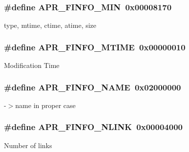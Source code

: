 \subsubsection[{\texorpdfstring{A\+P\+R\+\_\+\+F\+I\+N\+F\+O\+\_\+\+M\+IN}{APR_FINFO_MIN}}]{\setlength{\rightskip}{0pt plus 5cm}\#define A\+P\+R\+\_\+\+F\+I\+N\+F\+O\+\_\+\+M\+IN~0x00008170}\hypertarget{group__apr__file__stat_ga341104571b05550aa923cb14898a82ef}{}\label{group__apr__file__stat_ga341104571b05550aa923cb14898a82ef}
type, mtime, ctime, atime, size 
\subsubsection[{\texorpdfstring{A\+P\+R\+\_\+\+F\+I\+N\+F\+O\+\_\+\+M\+T\+I\+ME}{APR_FINFO_MTIME}}]{\setlength{\rightskip}{0pt plus 5cm}\#define A\+P\+R\+\_\+\+F\+I\+N\+F\+O\+\_\+\+M\+T\+I\+ME~0x00000010}\hypertarget{group__apr__file__stat_ga992ce1f4f75d519fd2a9d241c5a12515}{}\label{group__apr__file__stat_ga992ce1f4f75d519fd2a9d241c5a12515}
Modification Time 
\subsubsection[{\texorpdfstring{A\+P\+R\+\_\+\+F\+I\+N\+F\+O\+\_\+\+N\+A\+ME}{APR_FINFO_NAME}}]{\setlength{\rightskip}{0pt plus 5cm}\#define A\+P\+R\+\_\+\+F\+I\+N\+F\+O\+\_\+\+N\+A\+ME~0x02000000}\hypertarget{group__apr__file__stat_ga7fa4caf84808c11a1ec33c5c8d613e4b}{}\label{group__apr__file__stat_ga7fa4caf84808c11a1ec33c5c8d613e4b}
-\/$>$name in proper case 
\subsubsection[{\texorpdfstring{A\+P\+R\+\_\+\+F\+I\+N\+F\+O\+\_\+\+N\+L\+I\+NK}{APR_FINFO_NLINK}}]{\setlength{\rightskip}{0pt plus 5cm}\#define A\+P\+R\+\_\+\+F\+I\+N\+F\+O\+\_\+\+N\+L\+I\+NK~0x00004000}\hypertarget{group__apr__file__stat_gabb2ba05b8ed45e59b1f06e1b7b4c91c2}{}\label{group__apr__file__stat_gabb2ba05b8ed45e59b1f06e1b7b4c91c2}
Number of links 
